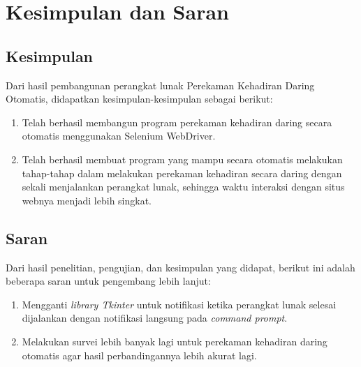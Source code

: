 \chapter{Kesimpulan dan Saran}
\label{chap:simpulandansaran}

\section{Kesimpulan}
\label{sec:kesimpulan} 
Dari hasil pembangunan perangkat lunak Perekaman Kehadiran Daring Otomatis, didapatkan kesimpulan-kesimpulan sebagai berikut:
\begin{enumerate}
	\item Telah berhasil membangun program perekaman kehadiran daring secara otomatis menggunakan Selenium WebDriver.
	\item Telah berhasil membuat program yang mampu secara otomatis melakukan tahap-tahap dalam melakukan perekaman kehadiran secara daring dengan sekali menjalankan perangkat lunak, sehingga waktu interaksi dengan situs webnya menjadi lebih singkat. 
\end{enumerate}

\section{Saran}
\label{sec:saran} 
Dari hasil penelitian, pengujian, dan kesimpulan yang didapat, berikut ini adalah  beberapa saran untuk pengembang lebih lanjut:
\begin{enumerate}
	\item Mengganti \textit{library Tkinter} untuk notifikasi ketika perangkat lunak selesai dijalankan dengan notifikasi langsung pada \textit{command prompt}.
	\item Melakukan survei lebih banyak lagi untuk perekaman kehadiran daring otomatis agar hasil perbandingannya lebih akurat lagi.
\end{enumerate}

